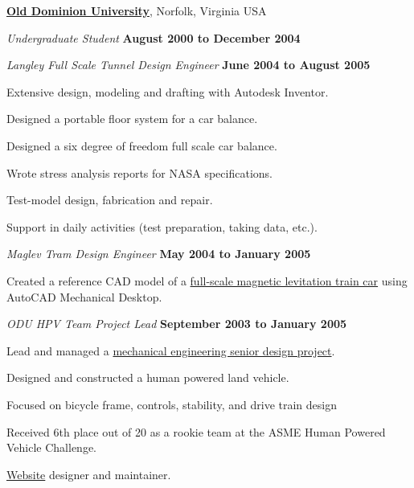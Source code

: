 \documentclass[10pt]{article}
\newenvironment{outerlist}[1][\enskip\textbullet]%
        {\begin{itemize}[#1]}{\end{itemize}%
         \vspace{-.6\baselineskip}}
\newenvironment{innerlist}[1][\enskip\textbullet]%
        {\begin{compactitem}[#1]}{\end{compactitem}}
\newcommand{\blankline}{\quad\pagebreak[2]}
\begin{document}
\blankline

\href{http://www.odu.edu}{\textbf{Old Dominion University}}, Norfolk, Virginia USA
\begin{outerlist}
  \item[] \textit{Undergraduate Student}%
    \hfill \textbf{August 2000 to December 2004}

  \item[] \textit{Langley Full Scale Tunnel Design Engineer}%
    \hfill \textbf{June 2004 to August 2005}
  \begin{innerlist}
    \item Extensive design, modeling and drafting with Autodesk Inventor.
    \item Designed a portable floor system for a car balance.
    \item Designed a six degree of freedom full scale car balance.
    \item Wrote stress analysis reports for NASA specifications.
    \item Test-model design, fabrication and repair.
    \item Support in daily activities (test preparation, taking data, etc.).
  \end{innerlist}

  \item[] \textit{Maglev Tram Design Engineer}%
    \hfill \textbf{May 2004 to January 2005}
  \begin{innerlist}
    \item Created a reference CAD model of a
      \href{http://ww2.eng.odu.edu/maglev/}{full-scale magnetic levitation
      train car} using AutoCAD Mechanical Desktop.
  \end{innerlist}

  \item[] \textit{ODU HPV Team Project Lead}%
    \hfill \textbf{September 2003 to January 2005}
  \begin{innerlist}
    \item Lead and managed a
      \href{http://www.lions.odu.edu/~dlandman/hpv/}{mechanical engineering
      senior design project}.
    \item Designed and constructed a human powered land vehicle.
    \item Focused on bicycle frame, controls, stability, and drive train design
    \item Received 6th place out of 20 as a rookie team at the ASME Human
        Powered Vehicle Challenge.
    \item \href{http://www.lions.odu.edu/~dlandman/hpv/}{Website} designer
      and maintainer.
  \end{innerlist}


\end{outerlist}
\end{document}
